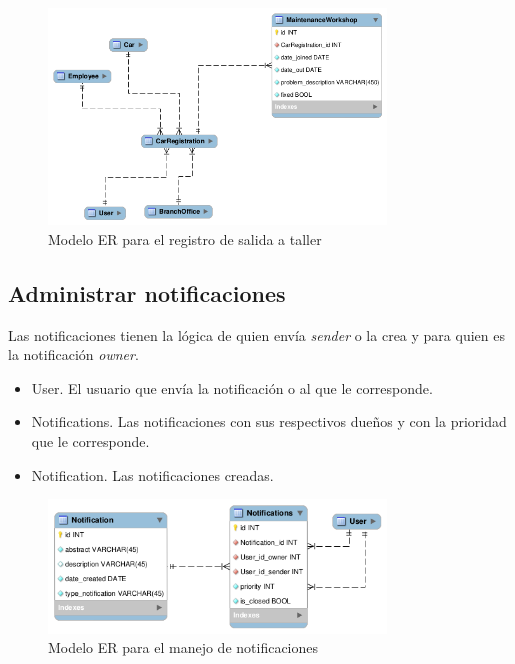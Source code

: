 \begin{figure}[h]
  \begin{center}
    \includegraphics[width=0.8\textwidth]{figures/chapter4/er_salida_taller.png}
    \caption[Modelo ER - Registro de salida a taller]{Modelo ER para el registro de salida a taller}
  \end{center}
\end{figure}

\subsection{Administrar notificaciones}
Las notificaciones tienen la lógica de quien envía {\it sender} o la crea y para
quien es la notificación {\it owner}.

\begin{itemize}
    \item User. El usuario que envía la notificación o al que le corresponde.
    \item Notifications. Las notificaciones con sus respectivos dueños y con la
      prioridad que le corresponde.
    \item Notification. Las notificaciones creadas.
\end{itemize}

\begin{figure}[h]
  \begin{center}
    \includegraphics[width=0.8\textwidth]{figures/chapter4/er_notificaciones.png}
    \caption[Modelo ER - Notificaciones]{Modelo ER para el manejo de notificaciones}
  \end{center}
\end{figure}


